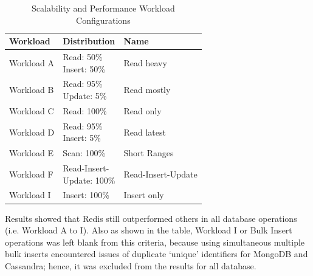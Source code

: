 \documentclass[5p]{elsarticle}
\begin{document}
\begin{table}[ht]
    \centering															
    \caption{Scalability and Performance Workload Configurations}
     \label{table.workload.definition}
     \begin{tabular}{lll}
        \toprule
        Workload & Distribution & Name \\
        \hline
        \rule{0pt}{20pt}Workload A &\makecell[l]{ Read: 50\%  \\ Insert: 50\%} & Read heavy        \\
        \rule{0pt}{20pt}Workload B &\makecell[l]{ Read: 95\%  \\ Update: 5\%}  & Read mostly       \\
        \rule{0pt}{20pt}Workload C &\makecell[l]{ Read: 100\% \\ }             & Read only         \\
        \rule{0pt}{20pt}Workload D &\makecell[l]{ Read: 95\%  \\ Insert: 5\%}  & Read latest       \\
        \rule{0pt}{20pt}Workload E & Scan: 100\%                               & Short Ranges      \\
        \rule{0pt}{20pt}Workload F &\makecell[l]{ Read-Insert-\\Update: 100\%} & Read-Insert-Update\\
        \rule{0pt}{12pt}Workload I &\makecell[l]{ Insert: 100\%\\ }            & Insert only       \\
        \hline
    \end{tabular}															
\end{table}		

Results showed that Redis still outperformed others in all database operations (i.e. Workload A to I).  
Also as shown in the table, Workload I or Bulk Insert operations was left blank from this criteria, because using simultaneous multiple bulk inserts 
encountered issues of duplicate ‘unique’ identifiers for MongoDB and Cassandra; hence, it was excluded from the results for all database.
													
\end{document}
